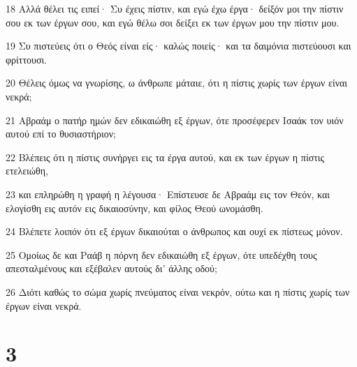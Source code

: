 \par 18 Αλλά θέλει τις ειπεί· Συ έχεις πίστιν, και εγώ έχω έργα· δείξόν μοι την πίστιν σου εκ των έργων σου, και εγώ θέλω σοι δείξει εκ των έργων μου την πίστιν μου.
\par 19 Συ πιστεύεις ότι ο Θεός είναι είς· καλώς ποιείς· και τα δαιμόνια πιστεύουσι και φρίττουσι.
\par 20 Θέλεις όμως να γνωρίσης, ω άνθρωπε μάταιε, ότι η πίστις χωρίς των έργων είναι νεκρά;
\par 21 Αβραάμ ο πατήρ ημών δεν εδικαιώθη εξ έργων, ότε προσέφερεν Ισαάκ τον υιόν αυτού επί το θυσιαστήριον;
\par 22 Βλέπεις ότι η πίστις συνήργει εις τα έργα αυτού, και εκ των έργων η πίστις ετελειώθη,
\par 23 και επληρώθη η γραφή η λέγουσα· Επίστευσε δε Αβραάμ εις τον Θεόν, και ελογίσθη εις αυτόν εις δικαιοσύνην, και φίλος Θεού ωνομάσθη.
\par 24 Βλέπετε λοιπόν ότι εξ έργων δικαιούται ο άνθρωπος και ουχί εκ πίστεως μόνον.
\par 25 Ομοίως δε και Ραάβ η πόρνη δεν εδικαιώθη εξ έργων, ότε υπεδέχθη τους απεσταλμένους και εξέβαλεν αυτούς δι' άλλης οδού;
\par 26 Διότι καθώς το σώμα χωρίς πνεύματος είναι νεκρόν, ούτω και η πίστις χωρίς των έργων είναι νεκρά.

\chapter{3}

